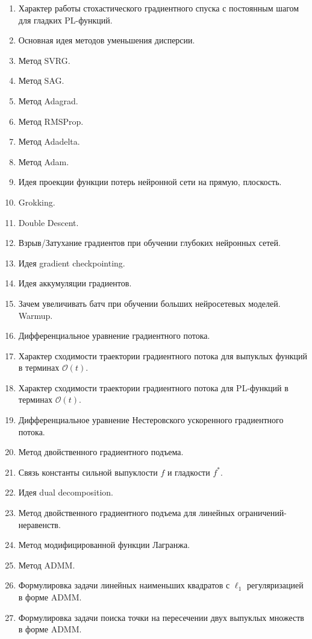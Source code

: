 \documentclass[
  letterpaper,
  DIV=11,
  numbers=noendperiod]{scrartcl}
\begin{document}
\begin{enumerate}
\item
  Характер работы стохастического градиентного спуска с постоянным шагом
  для гладких PL-функций.
\item
  Основная идея методов уменьшения дисперсии.
\item
  Метод SVRG.
\item
  Метод SAG.
\item
  Метод Adagrad.
\item
  Метод RMSProp.
\item
  Метод Adadelta.
\item
  Метод Adam.
\item
  Идея проекции функции потерь нейронной сети на прямую, плоскость.
\item
  Grokking.
\item
  Double Descent.
\item
  Взрыв/Затухание градиентов при обучении глубоких нейронных сетей.
\item
  Идея gradient checkpointing.
\item
  Идея аккумуляции градиентов.
\item
  Зачем увеличивать батч при обучении больших нейросетевых моделей.
  Warmup.
\item
  Дифференциальное уравнение градиентного потока.
\item
  Характер сходимости траектории градиентного потока для выпуклых
  функций в терминах \(\mathcal{O}\left( t \right)\).
\item
  Характер сходимости траектории градиентного потока для PL-функций в
  терминах \(\mathcal{O}\left( t \right)\).
\item
  Дифференциальное уравнение Нестеровского ускоренного градиентного
  потока.
\item
  Метод двойственного градиентного подъема.
\item
  Связь константы сильной выпуклости \(f\) и гладкости \(f^*\).
\item
  Идея dual decomposition.
\item
  Метод двойственного градиентного подъема для линейных
  ограничений-неравенств.
\item
  Метод модифицированной функции Лагранжа.
\item
  Метод ADMM.
\item
  Формулировка задачи линейных наименьших квадратов с \(\ell_1\)
  регуляризацией в форме ADMM.
\item
  Формулировка задачи поиска точки на пересечении двух выпуклых множеств
  в форме ADMM.
\end{enumerate}
\end{document}
